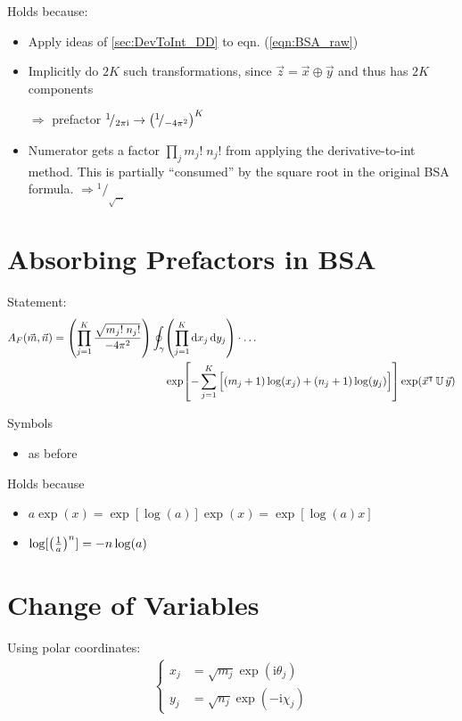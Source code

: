\documentclass[
	english,
	a4paper,
	fontsize=10pt,
	parskip=half,
	titlepage=true,
	DIV=12,
	final
]{scrreprt}
\newcommand*{\thus}{\ensuremath{\rightarrow}\xspace}
\newcommand*{\Thus}{\ensuremath{\Rightarrow}\xspace}
\newcommand*{\smallfrac}  [2]{\ensuremath{{}^        {#1} \!/_        {#2}}}
\newcommand*{\transp}{\ensuremath{^\intercal}}
\newcommand*{\iunit}{\ensuremath{\mathrm{i}}}
\begin{document}
Holds because:
\begin{itemize}
\item Apply ideas of \ref{sec:DevToInt_DD} to eqn. (\ref{eqn:BSA_raw})
\item Implicitly do $2K$ such transformations, since $\vec{z} = \vec{x} \oplus \vec{y}$ and thus has
	$2K$ components
\item[\Thus] prefactor $\smallfrac{1}{2\pi\iunit} \thus \qty( \smallfrac{1}{-4\pi^{2}} )^{K}$
\item Numerator gets a factor $\prod_{j} m_j! \; n_j!$ from applying the derivative-to-int method.
	This is partially \enquote{consumed} by the square root in the original BSA formula. \newline
	\Thus $\smallfrac{1}{\sqrt{\ldots}}$
\end{itemize}

\section{Absorbing Prefactors in BSA}
Statement:
\begin{align}
\nonumber
	A_F(\vec{m}, \vec{n})
=
	\qty(
		\prod_{j=1}^{K}
		\frac
			{\sqrt{m_j! \; n_j!}}
			{-4\pi^{2}}
	)
	\oint_{\gamma}
		& \qty(
			\prod_{j=1}^{K}
			\dd{x_j} \dd{y_j}
		)  \cdot \ldots \\
		& \exp[
			-\sum_{j=1}^{K} 
			\qty[ \Big.
				(m_j + 1) \log(x_j) +
				(n_j + 1) \log(y_j)
			]
		]
		\exp(\vec{x}\transp \, \mathbb{U} \, \vec{y})
\label{eqn:BSA_IntAbsorbed}
\end{align}

Symbols
\begin{itemize}
\item as before
\end{itemize}

Holds because
\begin{itemize}
\item $a \exp(x) = \exp[\log(a)] \exp(x) = \exp[\log(a) x]$
\item $\log[ \qty( \frac{1}{a} )^{n} ] = -n \log(a)$
\end{itemize}

\section{Change of Variables}
\label{sec:BSA_phases}
Using polar coordinates:
\begin{align}
	\begin{cases}
	x_j &= \sqrt{m_j} \exp( \iunit \theta_j) \\
	y_j &= \sqrt{n_j} \exp(-\iunit \chi  _j) 	
	\end{cases}
	\label{eqn:DefXY}
\end{align}
\end{document}
